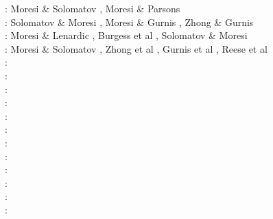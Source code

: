 \begin{itemize}
\begin{scriptsize}
\nineteenninetyfive: Moresi \& Solomatov \cite{moso95}, Moresi \& Parsons \cite{mopa95}\\
\nineteenninetysix: Solomatov \& Moresi \cite{somo96}, Moresi \& Gurnis \cite{mogu96}, Zhong \& Gurnis \cite{zhgu96}\\
\nineteenninetyseven: Moresi \& Lenardic \cite{mole97}, Burgess et al \cite{bugm97}, Solomatov \& Moresi \cite{somo97}\\
\nineteenninetyeight: Moresi \& Solomatov \cite{moso98}, Zhong et al \cite{zhgm98}, Gurnis et al \cite{gumm98}, Reese et al \cite{resm98}\\
\nineteenninetynine: \cite{mole99}\cite{bumo99}\cite{vazh99}\cite{lemo99}\cite{resm99}\\
\twothousand: \cite{zhzm00}\cite{gumr00}\cite{lemm00}\cite{gumm00}\cite{somo00}\\
\twothousandone: \cite{bigu01}\cite{lemo01}\cite{zhon01}\\
\twothousandtwo: \cite{tagh02}\cite{somo02}\\
\twothousandthree: \cite{vazh03}\cite{cogu03}\cite{bigu03}\cite{lemm03}\cite{lemo03}\cite{bigs03}\cite{vesh03}\\
\twothousandfour: \cite{solo04}\cite{frmm04}\cite{lenm04}\cite{colm04}\cite{mczh04}\\
\twothousandfive: \cite{bihi05}\cite{mczh05a}\cite{mczh05b}\cite{lemj05}\cite{zhon05}\\
\twothousandsix: \cite{beck06}\cite{pibf06}\cite{tact06}\cite{besb06}\cite{coli06}\cite{frmm06}\cite{colm06}
      \cite{zhon06}\cite{keso06}\cite{rozh06}\cite{zhpy06}\\
\twothousandseven: \cite{bihi07}\cite{zhzl07}\cite{magu07}\cite{bavi07}\cite{rimb07}\cite{mofm07}\cite{cobs07}
      \cite{qums07}\cite{huda07}\cite{rozh07}\\
\twothousandeight: \cite{dihf08}\cite{gamc08}\cite{zhmt08}\cite{hole08}\cite{lejm08}\cite{lisg08}\cite{chzy08}
      \cite{beke08}\cite{beck08}\cite{slee08}\cite{lezh08}\cite{king08}\cite{ligu08}\cite{meco08}
      \cite{roni08}\cite{splg08}\cite{divf08}\cite{vavg08}\\
\twothousandnine: \cite{lizh09}\cite{arhm09}\cite{zhzm09}\cite{anbi09}\cite{fobe09}\cite{bubi09}\cite{befa09}
      \cite{bavi09}\cite{lezh09}\cite{bogj09}\cite{zhon09}\cite{cohu09}\cite{coco09}\cite{keso09}
      \cite{maml09}\cite{nacl09}\cite{rolm09}\cite{splg09}\\
\twothousandten: \cite{bumb10}\cite{vabv10}\cite{baiv10}\cite{bubi10}\cite{zhzl10}\cite{bill10}\cite{cobe10}

\end{scriptsize}
\end{itemize}

